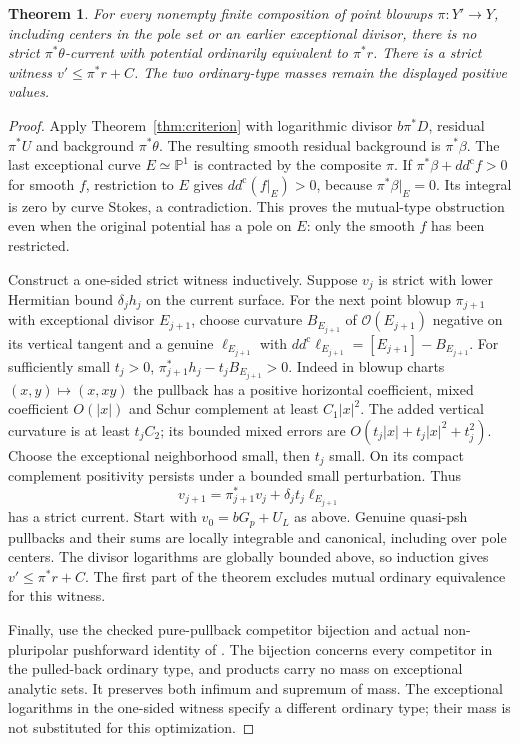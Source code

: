 \documentclass[11pt]{article}
\newtheorem{theorem}{Theorem}
\theoremstyle{remark}
\newcommand{\ddc}{dd^{\mathrm c}}
\newcommand{\PP}{\mathbb P}
\begin{document}
\begin{theorem}\label{thm:blowup}
For every nonempty finite composition of point blowups $\pi:Y'\to Y$,
including centers in the pole set or an earlier exceptional divisor,
there is no strict $\pi^*\theta$-current with potential ordinarily
equivalent to $\pi^*r$. There is a strict witness
$v'\leq\pi^*r+C$. The two ordinary-type masses remain the displayed
positive values.
\end{theorem}
\begin{proof}
Apply Theorem~\ref{thm:criterion} with logarithmic divisor
$b\pi^*D$, residual $\pi^*U$ and background $\pi^*\theta$.
The resulting smooth residual background is $\pi^*\beta$.
The last exceptional curve $E\simeq\PP^1$ is contracted by the
composite $\pi$. If $\pi^*\beta+\ddc f>0$ for smooth $f$, restriction
to $E$ gives $\ddc(f|_E)>0$, because $\pi^*\beta|_E=0$.
Its integral is zero by curve Stokes, a contradiction. This proves the
mutual-type obstruction even when the original potential has a pole on
$E$: only the smooth $f$ has been restricted.

Construct a one-sided strict witness inductively. Suppose $v_j$ is strict
with lower Hermitian bound $\delta_jh_j$ on the current surface. For the
next point blowup $\pi_{j+1}$ with exceptional divisor $E_{j+1}$, choose
curvature $B_{E_{j+1}}$ of $\mathcal O(E_{j+1})$ negative on its vertical
tangent and a genuine $\ell_{E_{j+1}}$ with
$\ddc\ell_{E_{j+1}}=[E_{j+1}]-B_{E_{j+1}}$.
For sufficiently small $t_j>0$,
$\pi_{j+1}^*h_j-t_jB_{E_{j+1}}>0$.
Indeed in blowup charts $(x,y)\mapsto(x,xy)$ the pullback has a positive
horizontal coefficient, mixed coefficient $O(|x|)$ and Schur complement
at least $C_1|x|^2$. The added vertical curvature is at least $t_jC_2$;
its bounded mixed errors are $O(t_j|x|+t_j|x|^2+t_j^2)$.
Choose the exceptional neighborhood small, then $t_j$ small. On its
compact complement positivity persists under a bounded small perturbation.
Thus
\[
 v_{j+1}=\pi_{j+1}^*v_j+\delta_jt_j\ell_{E_{j+1}}
\]
has a strict current. Start with $v_0=bG_p+U_L$ as above. Genuine
quasi-psh pullbacks and their sums are locally integrable and canonical,
including over pole centers. The divisor logarithms are globally bounded
above, so induction gives $v'\leq\pi^*r+C$. The first part of the
theorem excludes mutual ordinary equivalence for this witness.

Finally, use the checked pure-pullback competitor bijection and actual
non-pluripolar pushforward identity of \cite{Ruled}. The bijection concerns
every competitor in the pulled-back ordinary type, and products carry no
mass on exceptional analytic sets. It preserves both infimum and supremum
of mass. The exceptional logarithms in the one-sided witness specify a
different ordinary type; their mass is not substituted for this optimization.
\end{proof}
\end{document}
